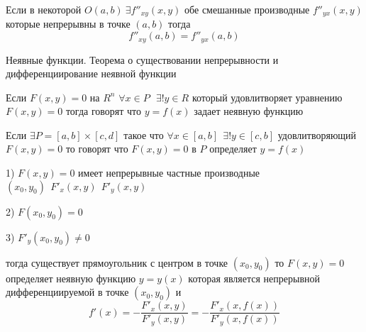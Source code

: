 \begin{theorem}
  Если в некоторой $O(a,b) ~ \exists f''_{xy}(x,y)$ обе смешанные производные
  $f''_{yx}(x,y)$ которые непрерывны в точке $(a,b)$ тогда
  $$
  f''_{xy}(a,b) = f''_{yx}(a,b)
  $$
\end{theorem}

\begin{title}[\Large]
  Неявные функции. Теорема о существовании непрерывности и дифференциирование
  неявной функции
\end{title}

\begin{define}
  Если $F(x, y) = 0$ на $R^n$ $\forall x \in P ~~~ \exists! y \in R$ который
  удовлитворяет уравнению $F(x, y) = 0$ тогда говорят что $y = f(x)$
  задает неявную функцию

  Если $\exists P = [a,b] \times [c,d]$ такое что $\forall x \in [a,b] ~~
  \exists! y \in [c,b]$ удовлитворяющий $F(x,y) = 0$ то говорят что
  $F(x,y) = 0$ в $P$ определяет $y = f(x)$
\end{define}

\begin{theorem}

  1) $F(x, y) = 0$ имеет непрерывные частные производные $(x_0, y_0) ~~
  F'_x(x,y) ~~ F'_y(x,y)$

  2) $F(x_0, y_0) = 0$

  3) $F'_y(x_0, y_0) \not= 0$

  тогда существует прямоугольник с центром в точке $(x_0, y_0)$ то
  $F(x, y) = 0$ определяет неявную функцию $y = y(x)$ которая является
  непрерывной дифференциируемой в точке $(x_0, y_0)$ и
  $$
  f'(x) = - \frac{F'_x(x, y)}{F'_y(x, y)} = -
  \frac{F'_x(x, f(x))}{F'_y(x, f(x))}
  $$
\end{theorem}

